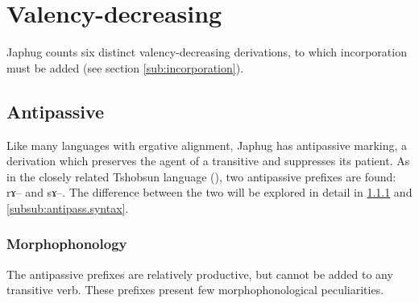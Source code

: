 \documentclass[oldfontcommands,oneside,a4paper,11pt]{memoir}
\newcommand{\ipa}[1]{{\phon #1}} %
\begin{document}
\section{Valency-decreasing} \label{sec:valency.decreasing}

Japhug counts six distinct valency-decreasing derivations, to which incorporation must be added (see section \ref{sub:incorporation}).


\subsection{Antipassive} \label{sub:antipassive}
Like many languages with ergative alignment, Japhug has antipassive marking, a derivation which preserves the agent of a transitive and suppresses its patient. As   in the closely related Tshobsun language  (\citealt[8]{jackson06paisheng}), two antipassive prefixes are found: \ipa{rɤ}-- and \ipa{sɤ}--. The difference between the two will be explored in detail in \ref{subsub:antipass.morpho} and \ref{subsub:antipass.syntax}.

\subsubsection{Morphophonology} \label{subsub:antipass.morpho}
The antipassive prefixes are relatively productive, but cannot be added to any transitive verb. These prefixes present few morphophonological peculiarities.
\end{document}
